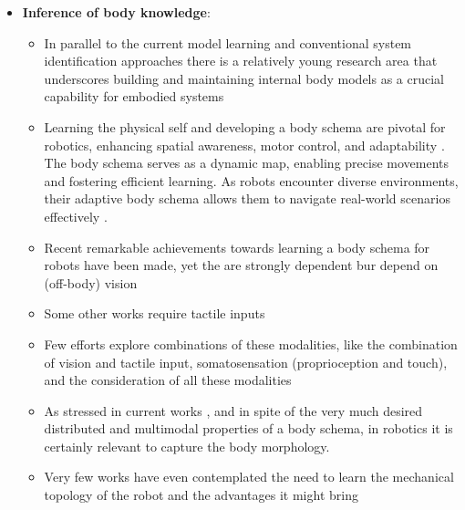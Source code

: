 \documentclass[12pt, a4paper]{article}
\begin{document}
\begin{itemize}
	
	\item \textbf{Inference of body knowledge}:
	\begin{itemize}
		\item In parallel to the current model learning and conventional system identification approaches there is a relatively young research area that underscores building and maintaining internal body models as a crucial capability for embodied systems
		\item Learning the physical self and developing a body schema are pivotal for robotics, enhancing spatial awareness, motor control, and adaptability \cite{Nguyen2021Sensorimotorrepresentationlearning}. The body schema serves as a dynamic map, enabling precise movements and fostering efficient learning. As robots encounter diverse environments, their adaptive body schema allows them to navigate real-world scenarios effectively \cite{Hoffmann2010Bodyschemarobotics}. 

		\item Recent remarkable achievements towards learning a body schema for robots have been made, yet the are strongly dependent bur depend on (off-body) vision \cite{Hersch2008Onlinelearningbody,MartinezCantin2010Bodyschemaacquisition,Hart2011roboticmodelecological,Lipson2019Taskagnosticself,Chen2022Fullybodyvisual,Sturm2009Bodyschemalearning}
		\item Some other works require tactile inputs\cite{Li2015Towardsbodyschema,Zenha2018Incrementaladaptationrobot,Gama2021Goaldirectedtactile}
		\item Few efforts explore combinations of these modalities, like the combination of vision and tactile input\cite{Fuke2007BodyImageConstructed}, somatosensation (proprioception and touch)\cite{Malinovska2022connectionistmodelassociating}, and the consideration of all these modalities \cite{Nguyen2019Reachingdevelopmentvisuo,Pugach2019BrainInspiredCoding,Lanillos2016Yieldingselfperception}


		\item As stressed in current works \cite{Chen2022Fullybodyvisual}, and in spite of the very much desired distributed and multimodal properties of a body schema, in robotics it is certainly relevant to capture the body morphology.
		\item Very few works have even contemplated the need to learn the mechanical topology of the robot and the advantages it might bring \cite{Bongard2006Automatedsynthesisbody,Bongard2006Resilientmachinescontinuous}
	\end{itemize}	
	

\end{itemize}
\end{document}

